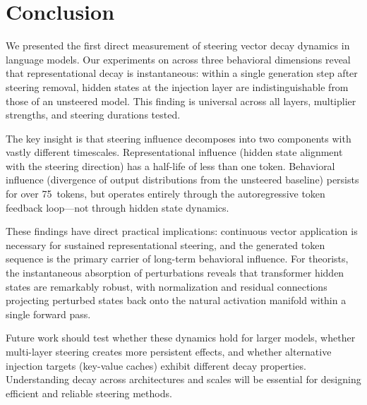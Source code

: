 \section{Conclusion}
\label{sec:conclusion}

We presented the first direct measurement of steering vector decay dynamics in
language models. Our experiments on \gptxl across three behavioral dimensions
reveal that representational decay is instantaneous: within a single generation
step after steering removal, hidden states at the injection layer are
indistinguishable from those of an unsteered model. This finding is universal
across all layers, multiplier strengths, and steering durations tested.

The key insight is that steering influence decomposes into two components with
vastly different timescales. Representational influence (hidden state alignment
with the steering direction) has a half-life of less than one token. Behavioral
influence (divergence of output distributions from the unsteered baseline)
persists for over 75~tokens, but operates entirely through the autoregressive
token feedback loop---not through hidden state dynamics.

These findings have direct practical implications: continuous vector application
is necessary for sustained representational steering, and the generated token
sequence is the primary carrier of long-term behavioral influence. For
theorists, the instantaneous absorption of perturbations reveals that
transformer hidden states are remarkably robust, with normalization and residual
connections projecting perturbed states back onto the natural activation
manifold within a single forward pass.

Future work should test whether these dynamics hold for larger models, whether
multi-layer steering creates more persistent effects, and whether alternative
injection targets (\eg key-value caches) exhibit different decay properties.
Understanding decay across architectures and scales will be essential for
designing efficient and reliable steering methods.
